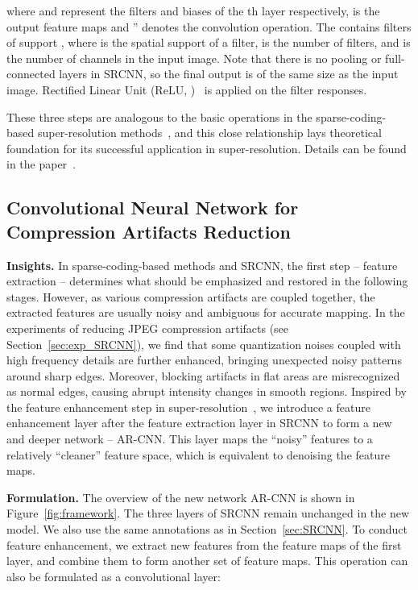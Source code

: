\documentclass[10pt,twocolumn,letterpaper]{article}
\begin{document}
where  and  represent the filters and biases of the th layer respectively,  is the output feature maps and '' denotes the convolution operation. The  contains  filters of support , where  is the spatial support of a filter,  is the number of filters, and  is the number of channels in the input image. Note that there is no pooling or full-connected layers in SRCNN, so the final output  is of the same size as the input image.
Rectified Linear Unit (ReLU, )~\cite{Nair2010} is applied on the filter responses.

These three steps are analogous to the basic operations in the sparse-coding-based super-resolution methods~\cite{Yang2010a}, and this close relationship lays theoretical foundation for its successful application in super-resolution. Details can be found in the paper~\cite{Dong2014}.


\subsection{Convolutional Neural Network for Compression Artifacts Reduction}
\label{sec:ARCNN}
\textbf{Insights.} In sparse-coding-based methods and SRCNN, the first step -- feature extraction -- determines what should be emphasized and restored in the following stages. However, as various compression artifacts are coupled together, the extracted features are usually noisy and ambiguous for accurate mapping. In the experiments of reducing JPEG compression artifacts (see Section~\ref{sec:exp_SRCNN}), we find that some quantization noises coupled with high frequency details are further enhanced, bringing unexpected noisy patterns around sharp edges. Moreover, blocking artifacts in flat areas are misrecognized as normal edges, causing abrupt intensity changes in smooth regions. Inspired by the feature enhancement step in super-resolution~\cite{Xiong2009}, we introduce a feature enhancement layer after the feature extraction layer in SRCNN to form a new and deeper network -- AR-CNN. This layer maps the ``noisy'' features to a relatively ``cleaner'' feature space, which is equivalent to denoising the feature maps.

\textbf{Formulation.} The overview of the new network AR-CNN is shown in Figure~\ref{fig:framework}. The three layers of SRCNN remain unchanged in the new model. We also use the same annotations as in Section~\ref{sec:SRCNN}. To conduct feature enhancement,
we extract new features from the  feature maps of the first layer, and combine them to form another set of feature maps.
This operation  can also be formulated as a convolutional layer:
\end{document}
